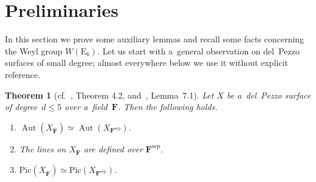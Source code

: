 \documentclass{amsart}
\numberwithin{equation}{section}
\theoremstyle{plain}
\newtheorem{theorem}{Theorem}
\theoremstyle{definition}
\theoremstyle{remark}
\begin{document}
\section{Preliminaries}
\label{s2}

In this section we prove some auxiliary lemmas and recall some facts concerning the Weyl group $W(\mathrm{E}_6)$. Let us start with a~general observation on del~Pezzo surfaces of small degree; almost everywhere below we use it without explicit reference.

\begin{theorem}[{cf.~\cite{13}, Theorem 4.2, and~\cite{15}, Lemma~7.1}]
\label{t4}
Let $X$ be a~del~Pezzo surface of degree~$d \leqslant 5$ over a~field~$\mathbf{F}$. Then the following holds.
\begin{enumerate}
\item[{\rm (i)}] $\operatorname{Aut}(X_{\overline{\mathbf{F}}}) \simeq \operatorname{Aut}(X_{\mathbf{F}^{\mathrm{sep}}})$.

\item[{\rm (ii)}] The lines on $X_{\overline{\mathbf{F}}}$ are defined over $\mathbf{F}^{\mathrm{sep}}$.

\item[{\rm (iii)}] $\mathrm{Pic}(X_{\overline{\mathbf{F}}}) \simeq \mathrm{Pic}(X_{\mathbf{F}^{\mathrm{sep}}})$.
\end{enumerate}
\end{theorem}
\end{document}

